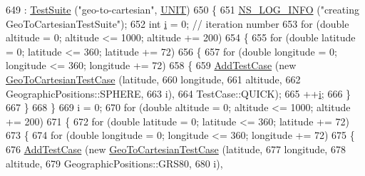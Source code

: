 \begin{DoxyCode}
649   : \hyperlink{classns3_1_1TestSuite_a904b0c40583b744d30908aeb94636d1a}{TestSuite} (\textcolor{stringliteral}{"geo-to-cartesian"}, \hyperlink{classns3_1_1TestSuite_a1ebfcab34ec8161e085e8e3a1855eae0a3885375a3787abf60431f8454b3cadbd}{UNIT})
650 \{
651   \hyperlink{group__logging_gafbd73ee2cf9f26b319f49086d8e860fb}{NS\_LOG\_INFO} (\textcolor{stringliteral}{"creating GeoToCartesianTestSuite"});
652   \textcolor{keywordtype}{int} \hyperlink{bernuolliDistribution_8m_a6f6ccfcf58b31cb6412107d9d5281426}{i} = 0; \textcolor{comment}{// iteration number}
653   \textcolor{keywordflow}{for} (\textcolor{keywordtype}{double} altitude = 0; altitude <= 1000; altitude += 200)
654     \{
655       \textcolor{keywordflow}{for} (\textcolor{keywordtype}{double} latitude = 0; latitude <= 360; latitude += 72)
656         \{
657           \textcolor{keywordflow}{for} (\textcolor{keywordtype}{double} longitude = 0; longitude <= 360; longitude += 72)
658             \{
659               \hyperlink{classns3_1_1TestCase_a3718088e3eefd5d6454569d2e0ddd835}{AddTestCase} (\textcolor{keyword}{new} \hyperlink{classGeoToCartesianTestCase}{GeoToCartesianTestCase} (latitude, 
660                                                        longitude, 
661                                                        altitude, 
662                                                        GeographicPositions::SPHERE,
663                                                        i), 
664                            TestCase::QUICK);
665               ++\hyperlink{bernuolliDistribution_8m_a6f6ccfcf58b31cb6412107d9d5281426}{i};
666             \}
667         \}
668     \}
669   i = 0;
670   \textcolor{keywordflow}{for} (\textcolor{keywordtype}{double} altitude = 0; altitude <= 1000; altitude += 200)
671     \{
672       \textcolor{keywordflow}{for} (\textcolor{keywordtype}{double} latitude = 0; latitude <= 360; latitude += 72)
673         \{
674           \textcolor{keywordflow}{for} (\textcolor{keywordtype}{double} longitude = 0; longitude <= 360; longitude += 72)
675             \{
676               \hyperlink{classns3_1_1TestCase_a3718088e3eefd5d6454569d2e0ddd835}{AddTestCase} (\textcolor{keyword}{new} \hyperlink{classGeoToCartesianTestCase}{GeoToCartesianTestCase} (latitude, 
677                                                        longitude, 
678                                                        altitude, 
679                                                        GeographicPositions::GRS80,
680                                                        i), 

\end{DoxyCode}
